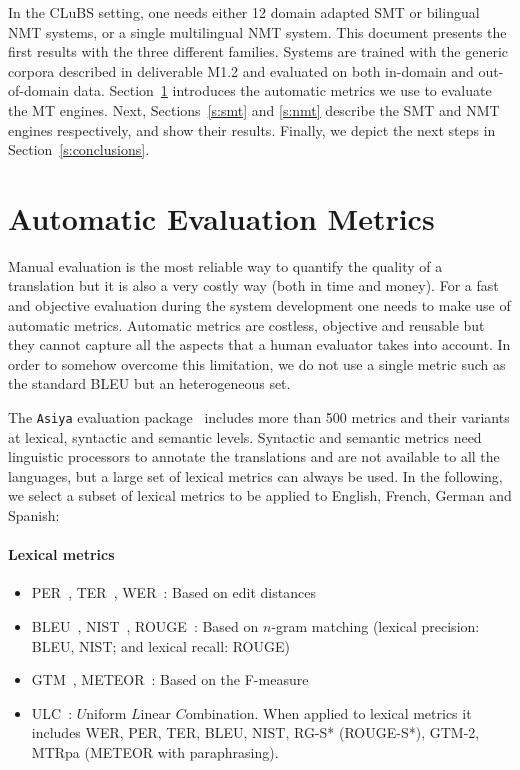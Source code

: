 \documentclass[a4paper,11pt]{article}
\begin{document}
In the CLuBS setting, one needs either 12 domain adapted SMT or bilingual NMT systems, or a single multilingual NMT system. This document presents the first results with the three different families. Systems are trained with the generic corpora described in deliverable M1.2 and evaluated on both in-domain and out-of-domain data. Section~\ref{s:eval} introduces the automatic metrics we use to evaluate the MT engines. Next, Sections~\ref{s:smt} and \ref{s:nmt} describe the SMT and NMT engines respectively, and show their results. Finally, we depict the next steps in Section~\ref{s:conclusions}.


\section{Automatic Evaluation Metrics}
\label{s:eval}

Manual evaluation is the most reliable way to quantify the quality of a translation but it is also a very costly way (both in time and money). For a fast and objective evaluation during the system development one needs to make use of automatic metrics. Automatic metrics are costless, objective and reusable but they cannot capture all the aspects that a human evaluator takes into account. In order to somehow overcome this limitation, we do not use a single metric such as the standard BLEU but an heterogeneous set.

The {\tt Asiya} evaluation package~\cite{PBML_Asiya:2010, Gonzalez:2012} includes more than 500 metrics and their variants at lexical, syntactic and semantic levels. Syntactic and semantic metrics need linguistic processors to annotate the translations and are not available to all the languages, but a large set of lexical metrics can always be used. In the following, we select a subset of lexical metrics to be applied to English, French, German and Spanish:

\newpage
\paragraph{Lexical metrics} 
\begin{itemize}
 \item PER~\cite{PER}, TER~\cite{TER}, WER~\cite{WER}: Based on edit distances
 \item BLEU~\cite{papineni2002}, NIST~\cite{NISTmetric}, ROUGE~\cite{ROUGE}: Based on $n$-gram matching (lexical precision: BLEU, NIST; and lexical recall: ROUGE)
 \item GTM~\cite{GTM}, METEOR~\cite{METEOR}: Based on the F-measure
 \item ULC~\cite{ULC}: $U$niform $L$inear $C$ombination. When applied to lexical metrics it includes WER, PER, TER, BLEU, NIST, 
 RG-S* (ROUGE-S*), GTM-2, MTRpa (METEOR with paraphrasing). 
\end{itemize}
\end{document}
